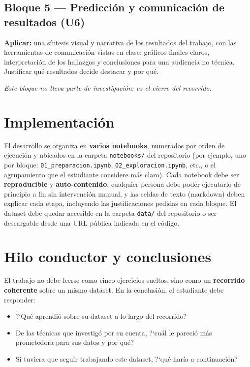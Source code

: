 \documentclass[11pt,a4paper]{article}
\newcommand{\codigo}[1]{\texttt{#1}}
\begin{document}
\subsection*{Bloque 5 --- Predicci\'on y comunicaci\'on de resultados (U6)}
\textbf{Aplicar:} una s\'intesis visual y narrativa de los resultados del trabajo, con las herramientas de comunicaci\'on vistas en clase: gr\'aficos finales claros, interpretaci\'on de los hallazgos y conclusiones para una audiencia no t\'ecnica. Justificar qu\'e resultados decide destacar y por qu\'e.

\textit{Este bloque no lleva parte de investigaci\'on: es el cierre del recorrido.}

\section{Implementaci\'on}
El desarrollo se organiza en \textbf{varios notebooks}, numerados por orden de ejecuci\'on y ubicados en la carpeta \codigo{notebooks/} del repositorio (por ejemplo, uno por bloque: \codigo{01\_preparacion.ipynb}, \codigo{02\_exploracion.ipynb}, etc., o el agrupamiento que el estudiante considere m\'as claro). Cada notebook debe ser \textbf{reproducible} y \textbf{auto-contenido}: cualquier persona debe poder ejecutarlo de principio a fin sin intervenci\'on manual, y las celdas de texto (markdown) deben explicar cada etapa, incluyendo las justificaciones pedidas en cada bloque. El dataset debe quedar accesible en la carpeta \codigo{data/} del repositorio o ser descargable desde una URL p\'ublica indicada en el c\'odigo.

\section{Hilo conductor y conclusiones}
El trabajo no debe leerse como cinco ejercicios sueltos, sino como un \textbf{recorrido coherente} sobre un mismo dataset. En la conclusi\'on, el estudiante debe responder:
\begin{itemize}[leftmargin=2em,itemsep=2pt]
    \item ?`Qu\'e aprendi\'o sobre su dataset a lo largo del recorrido?
    \item De las t\'ecnicas que investig\'o por su cuenta, ?`cu\'al le pareci\'o m\'as prometedora para sus datos y por qu\'e?
    \item Si tuviera que seguir trabajando este dataset, ?`qu\'e har\'ia a continuaci\'on?
\end{itemize}
\end{document}
